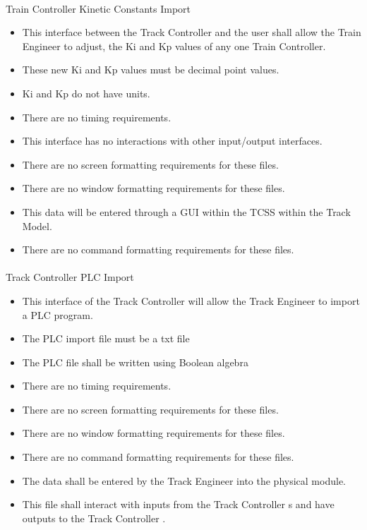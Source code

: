 \documentclass{article}
\begin{document}
    \paragraph{}
    Train Controller  Kinetic Constants Import
    \begin{itemize}
        \item This interface  between the Track Controller  and the user shall allow the Train Engineer  to adjust, the Ki and Kp values of any one Train Controller.
        \item These new Ki and Kp values must be decimal point values.
        \item Ki and Kp do not have units.
        \item There are no timing requirements.
        \item This interface  has no interactions with other input/output interfaces.
        \item There are no screen formatting requirements for these files.
        \item There are no window formatting requirements for these files. 
        \item This data will be entered through a GUI within the TCSS within the Track Model.
        \item There are no command formatting requirements for these files.
    \end{itemize}
    
    \paragraph{}
    Track Controller  PLC  Import
    \begin{itemize}
        \item This interface  of the Track Controller  will allow the Track Engineer to import a PLC  program. 
        \item The PLC  import file must be a txt file
        \item The PLC  file shall be written using Boolean algebra
        \item There are no timing requirements.
        \item There are no screen formatting requirements for these files.
        \item There are no window formatting requirements for these files. 
        \item There are no command formatting requirements for these files.
        \item The data shall be entered by the Track Engineer into the physical module.
        \item This file shall interact with inputs from the Track Controller s and have outputs to the Track Controller .
    \end{itemize}
    
\end{document}
